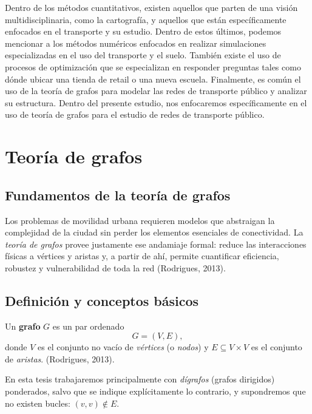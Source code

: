 \documentclass[openany]{book}
\begin{document}
		Dentro de los métodos cuantitativos, existen aquellos que parten de una visión multidisciplinaria, como la cartografía, y aquellos que están específicamente enfocados en el transporte y su estudio. Dentro de estos últimos, podemos mencionar a los métodos numéricos enfocados en realizar simulaciones especializadas en el uso del transporte y el suelo. También existe el uso de procesos de optimización que se especializan en responder preguntas tales como dónde ubicar una tienda de retail o una nueva escuela. Finalmente, es común el uso de la teoría de grafos para modelar las redes de transporte público y analizar su estructura. Dentro del presente estudio, nos enfocaremos específicamente en el uso de teoría de grafos para el estudio de redes de transporte público.

	\section{Teoría de grafos}	

		\subsection{Fundamentos de la teoría de grafos}

		Los problemas de movilidad urbana requieren modelos que abstraigan la complejidad de la ciudad sin perder los elementos esenciales de conectividad. La
		\emph{teoría de grafos} provee justamente ese andamiaje formal: reduce las interacciones físicas a vértices y aristas y, a partir de ahí, permite
		cuantificar eficiencia, robustez y vulnerabilidad de toda la red (Rodrigues, 2013).

		\subsection{Definición y conceptos básicos}
		\begin{definition}
		Un \textbf{grafo} $G$ es un par ordenado
		\begin{equation}
			G = (V,E),
		\end{equation}
		donde $V$ es el conjunto no vacío de \emph{vértices} (o \emph{nodos}) y $E \subseteq V\times V$ es el conjunto de \emph{aristas}. (Rodrigues, 2013).
		\end{definition}

		En esta tesis trabajaremos principalmente con \emph{dígrafos} (grafos dirigidos) ponderados, salvo que se indique explícitamente lo contrario, y supondremos que no existen bucles: $(v,v) \notin E$.
\end{document}
